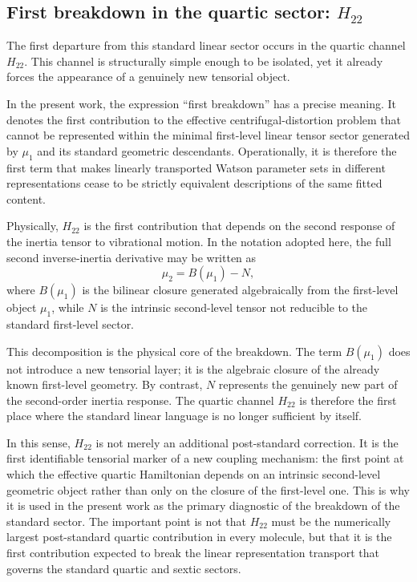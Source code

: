 \documentclass[aip,jcp,reprint,floatfix]{revtex4-2}
\begin{document}
\subsection{First breakdown in the quartic sector: \texorpdfstring{$H_{22}$}{H22}}

The first departure from this standard linear sector occurs in the
quartic channel $H_{22}$. This channel is structurally simple enough
to be isolated, yet it already forces the appearance of a genuinely
new tensorial object.

In the present work, the expression ``first breakdown'' has a precise
meaning. It denotes the first contribution to the effective
centrifugal-distortion problem that cannot be represented within the
minimal first-level linear tensor sector generated by $\mu_1$ and its
standard geometric descendants. Operationally, it is therefore the
first term that makes linearly transported Watson parameter sets in
different representations cease to be strictly equivalent descriptions
of the same fitted content.

Physically, $H_{22}$ is the first contribution that depends on the
second response of the inertia tensor to vibrational motion. In the
notation adopted here, the full second inverse-inertia derivative may
be written as
\begin{equation}
\mu_2 = B(\mu_1) - N,
\end{equation}
where $B(\mu_1)$ is the bilinear closure generated algebraically from
the first-level object $\mu_1$, while $N$ is the intrinsic second-level
tensor not reducible to the standard first-level sector.

This decomposition is the physical core of the breakdown. The term
$B(\mu_1)$ does not introduce a new tensorial layer; it is the
algebraic closure of the already known first-level geometry. By
contrast, $N$ represents the genuinely new part of the second-order
inertia response. The quartic channel $H_{22}$ is therefore the first
place where the standard linear language is no longer sufficient by
itself.

In this sense, $H_{22}$ is not merely an additional post-standard
correction. It is the first identifiable tensorial marker of a new
coupling mechanism: the first point at which the effective quartic
Hamiltonian depends on an intrinsic second-level geometric object
rather than only on the closure of the first-level one. This is why
it is used in the present work as the primary diagnostic of the
breakdown of the standard sector. The important point is not that
$H_{22}$ must be the numerically largest post-standard quartic
contribution in every molecule, but that it is the first contribution
expected to break the linear representation transport that governs the
standard quartic and sextic sectors.
\end{document}
